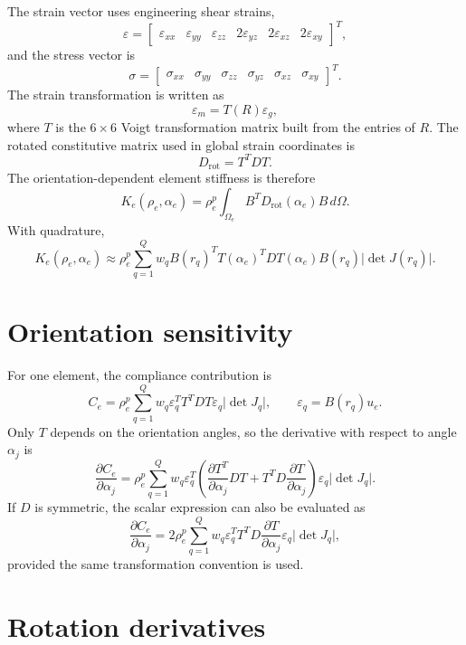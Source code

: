 The strain vector uses engineering shear strains,
\[
\varepsilon =
\begin{bmatrix}
\varepsilon_{xx} &
\varepsilon_{yy} &
\varepsilon_{zz} &
2\varepsilon_{yz} &
2\varepsilon_{xz} &
2\varepsilon_{xy}
\end{bmatrix}^T ,
\]
and the stress vector is
\[
\sigma =
\begin{bmatrix}
\sigma_{xx} &
\sigma_{yy} &
\sigma_{zz} &
\sigma_{yz} &
\sigma_{xz} &
\sigma_{xy}
\end{bmatrix}^T .
\]
The strain transformation is written as
\[
\varepsilon_m = T(R)\varepsilon_g ,
\]
where \(T\) is the \(6\times6\) Voigt transformation matrix built from the entries of \(R\). The rotated constitutive matrix used in global strain coordinates is
\[
D_\mathrm{rot}=T^TDT .
\]
The orientation-dependent element stiffness is therefore
\[
K_e(\rho_e,\alpha_e)
=
\rho_e^p
\int_{\Omega_e}
B^T D_\mathrm{rot}(\alpha_e) B\,d\Omega .
\]
With quadrature,
\[
K_e(\rho_e,\alpha_e)
\approx
\rho_e^p
\sum_{q=1}^{Q}
w_q B(r_q)^T T(\alpha_e)^T D T(\alpha_e)B(r_q)
\lvert \det J(r_q)\rvert .
\]

\section{Orientation sensitivity}

For one element, the compliance contribution is
\[
C_e
=
\rho_e^p
\sum_{q=1}^{Q}
w_q
\varepsilon_q^T
T^TDT
\varepsilon_q
\lvert \det J_q\rvert ,
\qquad
\varepsilon_q = B(r_q)u_e .
\]
Only \(T\) depends on the orientation angles, so the derivative with respect to angle \(\alpha_j\) is
\[
\frac{\partial C_e}{\partial \alpha_j}
=
\rho_e^p
\sum_{q=1}^{Q}
w_q
\varepsilon_q^T
\left(
\frac{\partial T^T}{\partial \alpha_j}DT
+
T^TD\frac{\partial T}{\partial \alpha_j}
\right)
\varepsilon_q
\lvert \det J_q\rvert .
\]
If \(D\) is symmetric, the scalar expression can also be evaluated as
\[
\frac{\partial C_e}{\partial \alpha_j}
=
2\rho_e^p
\sum_{q=1}^{Q}
w_q
\varepsilon_q^T
T^TD\frac{\partial T}{\partial \alpha_j}
\varepsilon_q
\lvert \det J_q\rvert ,
\]
provided the same transformation convention is used.

\section{Rotation derivatives}

